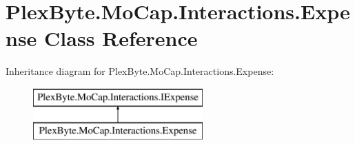 \hypertarget{class_plex_byte_1_1_mo_cap_1_1_interactions_1_1_expense}{}\section{Plex\+Byte.\+Mo\+Cap.\+Interactions.\+Expense Class Reference}
\label{class_plex_byte_1_1_mo_cap_1_1_interactions_1_1_expense}
Inheritance diagram for Plex\+Byte.\+Mo\+Cap.\+Interactions.\+Expense\+:\begin{figure}[H]
\begin{center}
\leavevmode
\includegraphics[height=2.000000cm]{class_plex_byte_1_1_mo_cap_1_1_interactions_1_1_expense}
\end{center}
\end{figure}

